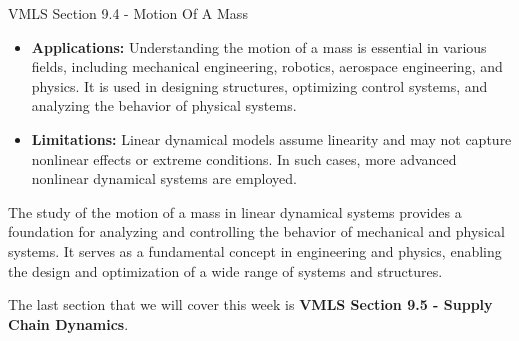 \begin{notes}{VMLS Section 9.4 - Motion Of A Mass}
\begin{itemize}
        and adjusted in real-time, plays a significant role in engineering applications.
        \item \textbf{Applications:} Understanding the motion of a mass is essential in various fields, including mechanical engineering, robotics, aerospace engineering, and physics. It is used in 
        designing structures, optimizing control systems, and analyzing the behavior of physical systems.
        \item \textbf{Limitations:} Linear dynamical models assume linearity and may not capture nonlinear effects or extreme conditions. In such cases, more advanced nonlinear dynamical systems are 
        employed.
    \end{itemize}
    
    The study of the motion of a mass in linear dynamical systems provides a foundation for analyzing and controlling the behavior of mechanical and physical systems. It serves as a fundamental concept 
    in engineering and physics, enabling the design and optimization of a wide range of systems and structures.
\end{notes}

The last section that we will cover this week is \textbf{VMLS Section 9.5 - Supply Chain Dynamics}.

